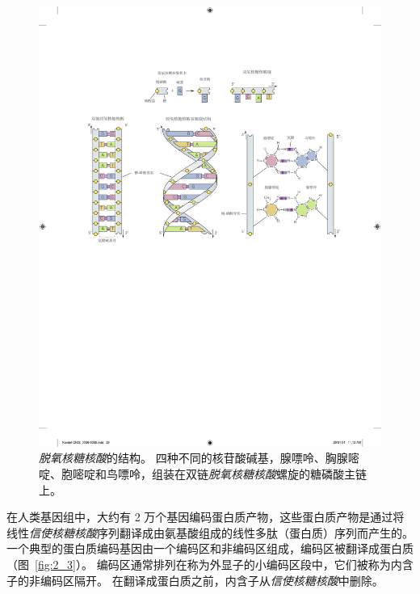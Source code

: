 \begin{figure}[htbp]
	\centering
	\includegraphics[width=0.85\linewidth]{chap02/fig_2_2}
	\caption{\textit{脱氧核糖核酸}的结构。
		四种不同的核苷酸碱基，腺嘌呤、胸腺嘧啶、胞嘧啶和鸟嘌呤，组装在双链\textit{脱氧核糖核酸}螺旋的糖磷酸主链上\cite{alberts2017molecular}。}
	\label{fig:2_2}
\end{figure}


在人类基因组中，大约有 2 万个基因编码蛋白质产物，这些蛋白质产物是通过将线性\textit{信使核糖核酸}序列翻译成由氨基酸组成的线性多肽（蛋白质）序列而产生的。
一个典型的蛋白质编码基因由一个编码区和非编码区组成，编码区被翻译成蛋白质（图~\ref{fig:2_3}）。
编码区通常排列在称为外显子的小编码区段中，它们被称为内含子的非编码区隔开。
在翻译成蛋白质之前，内含子从\textit{信使核糖核酸}中删除。



